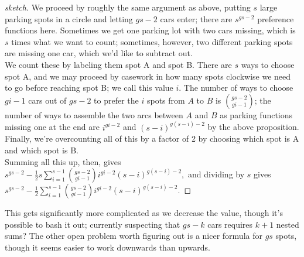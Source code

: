 \begin{proof}[sketch]
    We proceed by roughly the same argument as above, putting $s$ large parking spots in a circle and letting $gs-2$ cars enter; there are $s^{gs-2}$ preference functions here. Sometimes we get one parking lot with two cars missing, which is $s$ times what we want to count; sometimes, however, two different parking spots are missing one car, which we'd like to subtract out.\\

    We count these by labeling them spot A and spot B. There are $s$ ways to choose spot A, and we may proceed by casework in how many spots clockwise we need to go before reaching spot B; we call this value $i.$ The number of ways to choose $gi-1$ cars out of $gs-2$ to prefer the $i$ spots from $A$ to $B$ is $\binom{gs-2}{gi-1}$; the number of ways to assemble the two arcs between $A$ and $B$ as parking functions missing one at the end are $i^{gi-2}$ and $(s-i)^{g(s-i)-2}$ by the above proposition. Finally, we're overcounting all of this by a factor of 2 by choosing which spot is A and which spot is B.\\

    Summing all this up, then, gives $\displaystyle s^{gs-2}-\frac{1}{2}s\sum_{i=1}^{s-1}\binom{gs-2}{gi-1}i^{gi-2}(s-i)^{g(s-i)-2},$ and dividing by $s$ gives $\displaystyle s^{gs-2}-\frac{1}{2}\sum_{i=1}^{s-1}\binom{gs-2}{gi-1}i^{gi-2}(s-i)^{g(s-i)-2}.$
\end{proof}

This gets significantly more complicated as we decrease the value, though it's possible to bash it out; currently suspecting that $gs-k$ cars requires $k+1$ nested sums? The other open problem worth figuring out is a nicer formula for $gs$ spots, though it seems easier to work downwards than upwards.

